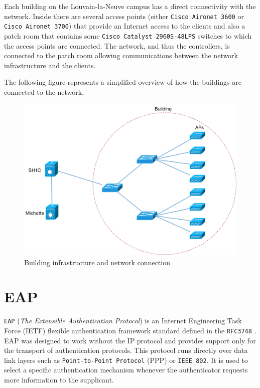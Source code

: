 Each building on the Louvain-la-Neuve campus has a direct connectivity with the network. Inside there are several access points (either \texttt{Cisco Aironet 3600} or \texttt{Cisco Aironet 3700}) that provide an Internet access to the clients and also a patch room that contains some \texttt{Cisco Catalyst 2960S-48LPS} switches to which the access points are connected. The network, and thus the controllers, is connected to the patch room allowing communications between the network infrastructure and the clients.

The following figure represents a simplified overview of how the buildings are connected to the network.

\begin{figure}[H]
	\includegraphics[width=1\linewidth]{Pictures/Chapter2/building.png}
	\caption{Building infrastructure and network connection}
\end{figure}



\section{EAP}
\texttt{EAP} (\textit{The Extensible Authentication Protocol}) is an Internet Engineering Task Force (IETF) flexible authentication framework standard defined in the \texttt{RFC3748} \cite{rfc3748}. EAP was designed to work without the IP protocol and provides support only for the transport of authentication protocols. This protocol runs directly over data link layers such as \texttt{Point-to-Point Protocol} (PPP) or \texttt{IEEE 802}. It is used to select a specific authentication mechanism whenever the authenticator requests more information to the supplicant.

